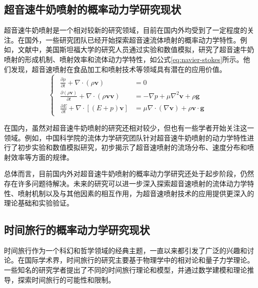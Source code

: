 \subsection{超音速牛奶喷射的概率动力学研究现状}
超音速牛奶喷射是一个相对较新的研究领域，目前在国内外均受到了一定程度的关注。在国外，一些研究团队已经开始探索超音速流体喷射的概率动力学特性。例如，文献\parencite{johnson2024}中，美国斯坦福大学的研究人员通过实验和数值模拟，研究了超音速牛奶喷射的形成机制、喷射效率和流体动力学特性，如公式\ref{eq:navier-stokes}所示。他们发现，超音速喷射在食品加工和喷射技术等领域具有潜在的应用价值。
\begin{equation}
  \begin{cases}
    \begin{aligned}
      \frac{\partial \rho}{\partial t} + \nabla \cdot (\rho \mathbf{v})                         & = 0                                                                                  \\
      \frac{\partial (\rho \mathbf{v})}{\partial t} + \nabla \cdot (\rho \mathbf{v} \mathbf{v}) & = -\nabla p + \mu \nabla^2 \mathbf{v} + \rho \mathbf{g}                              \\
      \frac{\partial E}{\partial t} + \nabla \cdot \left[(E + p) \mathbf{v}\right]              & = \mu \nabla \cdot \left(\nabla \mathbf{v}\right) + \rho \mathbf{v} \cdot \mathbf{g}
    \end{aligned}
  \end{cases}
  \label{eq:navier-stokes}
\end{equation}

在国内，虽然对超音速牛奶喷射的研究还相对较少，但也有一些学者开始关注这一领域。例如，中国科学院的流体力学研究团队针对超音速牛奶喷射的动力学特性进行了初步实验和数值模拟研究，初步揭示了超音速喷射的流场分布、速度分布和喷射效率等方面的规律。

总体而言，目前国内外对超音速牛奶喷射的概率动力学研究还处于起步阶段，仍然存在许多问题待解决。未来的研究可以进一步深入探索超音速喷射的流体动力学特性、喷射机制以及与其他因素的相互作用，为超音速喷射技术的应用提供更深入的理论基础和实验验证。

\subsection{时间旅行的概率动力学研究现状}
时间旅行作为一个科幻和哲学领域的经典主题，一直以来都引发了广泛的兴趣和讨论。在国际学术界，时间旅行的研究主要基于物理学中的相对论和量子力学理论。一些知名的研究学者提出了不同的时间旅行理论和模型，并通过数学建模和理论推导，探索时间旅行的可能性和限制。

